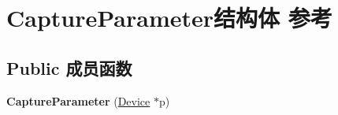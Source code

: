 \hypertarget{struct_capture_parameter}{\section{Capture\+Parameter结构体 参考}
\label{struct_capture_parameter}
}
\subsection*{Public 成员函数}
\begin{DoxyCompactItemize}
\item 
\hypertarget{struct_capture_parameter_a7e331c8240480d64d475db198a4a1851}{{\bfseries Capture\+Parameter} (\hyperlink{classmv_i_m_p_a_c_t_1_1acquire_1_1_device}{Device} $\ast$p)}\label{struct_capture_parameter_a7e331c8240480d64d475db198a4a1851}

\end{DoxyCompactItemize}
